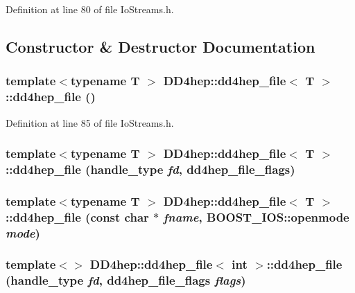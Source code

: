 Definition at line 80 of file IoStreams.h.

\subsection{Constructor \& Destructor Documentation}
\hypertarget{class_d_d4hep_1_1dd4hep__file_ac14f4f89341ab662c41c0b1de784c458}{
\subsubsection[{dd4hep\_\-file}]{\setlength{\rightskip}{0pt plus 5cm}template$<$typename T $>$ {\bf DD4hep::dd4hep\_\-file}$<$ {\bf T} $>$::{\bf dd4hep\_\-file} ()}}
\label{class_d_d4hep_1_1dd4hep__file_ac14f4f89341ab662c41c0b1de784c458}


Definition at line 85 of file IoStreams.h.\hypertarget{class_d_d4hep_1_1dd4hep__file_a171ba6ea4aa627da95bfd8bb7d8aa7a2}{
\subsubsection[{dd4hep\_\-file}]{\setlength{\rightskip}{0pt plus 5cm}template$<$typename T $>$ {\bf DD4hep::dd4hep\_\-file}$<$ {\bf T} $>$::{\bf dd4hep\_\-file} ({\bf handle\_\-type} {\em fd}, \/  {\bf dd4hep\_\-file\_\-flags})}}
\label{class_d_d4hep_1_1dd4hep__file_a171ba6ea4aa627da95bfd8bb7d8aa7a2}
\hypertarget{class_d_d4hep_1_1dd4hep__file_a7d25851ca4633fca12a3d23ec2eb4fe1}{
\subsubsection[{dd4hep\_\-file}]{\setlength{\rightskip}{0pt plus 5cm}template$<$typename T $>$ {\bf DD4hep::dd4hep\_\-file}$<$ {\bf T} $>$::{\bf dd4hep\_\-file} (const char $\ast$ {\em fname}, \/  BOOST\_\-IOS::openmode {\em mode})}}
\label{class_d_d4hep_1_1dd4hep__file_a7d25851ca4633fca12a3d23ec2eb4fe1}
\hypertarget{class_d_d4hep_1_1dd4hep__file_ab9b135c2f27804dee1c5a23c321c9cf5}{
\subsubsection[{dd4hep\_\-file}]{\setlength{\rightskip}{0pt plus 5cm}template$<$$>$ {\bf DD4hep::dd4hep\_\-file}$<$ int $>$::{\bf dd4hep\_\-file} ({\bf handle\_\-type} {\em fd}, \/  {\bf dd4hep\_\-file\_\-flags} {\em flags})}}
\label{class_d_d4hep_1_1dd4hep__file_ab9b135c2f27804dee1c5a23c321c9cf5}


